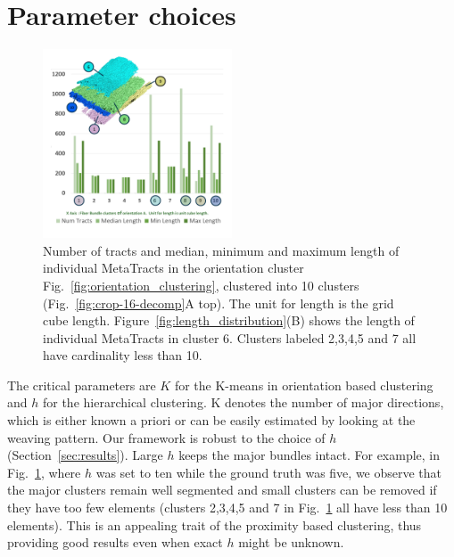 \section{Parameter choices}
\label{sec:param_choices}
\begin{figure}
\centering
	\includegraphics[width=0.5\textwidth,  trim = 10mm 40mm 0mm 15mm, clip]{imagesMT2014/image_length_histogram.pdf}
	\caption{Number of tracts and median, minimum and maximum length of individual MetaTracts in the orientation cluster Fig.~\ref{fig:orientation_clustering}, clustered into 10 clusters (Fig.~\ref{fig:crop-16-decomp}A top). The unit for length is the grid cube length. Figure~\ref{fig:length_distribution}(B) shows the length of individual MetaTracts in cluster 6. Clusters labeled 2,3,4,5 and 7 all have cardinality less than 10. }
	\label{fig:len_dist_crop16}
\end{figure}
The critical parameters are $K$ for the K-means in orientation based clustering and $h$ for the hierarchical clustering. K denotes the number of major directions, which is either known a priori or can be easily estimated by looking at the weaving pattern. 
Our framework is robust to the choice of $h$ (Section~\ref{sec:results}). Large $h$ keeps the major bundles intact. For example, in  Fig.~\ref{fig:len_dist_crop16}, where $h$ was set to ten while the ground truth was five, we observe that the major clusters remain well segmented and small clusters can be removed if they have too few elements (clusters 2,3,4,5 and 7 in Fig.~\ref{fig:len_dist_crop16} all have less than 10 elements). This is an appealing trait of the proximity based clustering, thus providing good results even when exact $h$ might be unknown.
